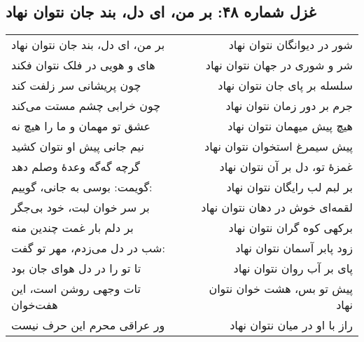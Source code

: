 \begin{center}
\section*{غزل شماره ۴۸: بر من، ای دل، بند جان نتوان نهاد}
\label{sec:048}
\begin{longtable}{l p{0.5cm} r}
بر من، ای دل، بند جان نتوان نهاد
&&
شور در دیوانگان نتوان نهاد
\\
های و هویی در فلک نتوان فکند
&&
شر و شوری در جهان نتوان نهاد
\\
چون پریشانی سر زلفت کند
&&
سلسله بر پای جان نتوان نهاد
\\
چون خرابی چشم مستت می‌کند
&&
جرم بر دور زمان نتوان نهاد
\\
عشق تو مهمان و ما را هیچ نه
&&
هیچ پیش میهمان نتوان نهاد
\\
نیم جانی پیش او نتوان کشید
&&
پیش سیمرغ استخوان نتوان نهاد
\\
گرچه گه‌گه وعدهٔ وصلم دهد
&&
غمزهٔ تو، دل بر آن نتوان نهاد
\\
گویمت: بوسی به جانی، گوییم:
&&
بر لبم لب رایگان نتوان نهاد
\\
بر سر خوان لبت، خود بی‌جگر
&&
لقمه‌ای خوش در دهان نتوان نهاد
\\
بر دلم بار غمت چندین منه
&&
برکهی کوه گران نتوان نهاد
\\
شب در دل می‌زدم، مهر تو گفت:
&&
زود پابر آسمان نتوان نهاد
\\
تا تو را در دل هوای جان بود
&&
پای بر آب روان نتوان نهاد
\\
تات وجهی روشن است، این هفت‌خوان
&&
پیش تو بس، هشت خوان نتوان نهاد
\\
ور عراقی محرم این حرف نیست
&&
راز با او در میان نتوان نهاد
\\
\end{longtable}
\end{center}
